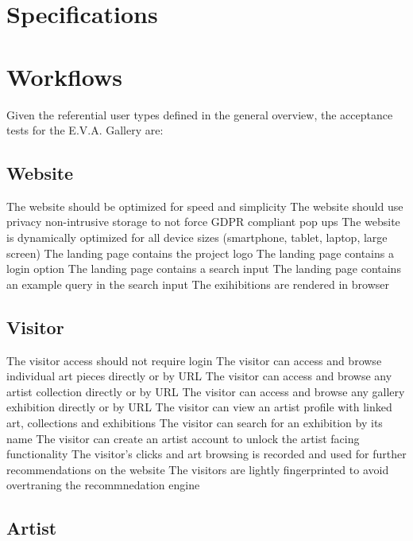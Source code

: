 \newpage

\chapter{Specifications}

\newpage

\chapter{Workflows}
Given the referential user types defined in the general overview, the acceptance tests for the E.V.A. Gallery are:
\section{Website}

    The website should be optimized for speed and simplicity
    The website should use privacy non-intrusive storage to not force GDPR compliant pop ups
    The website is dynamically optimized for all device sizes (smartphone, tablet, laptop, large screen)
    The landing page contains the project logo
    The landing page contains a login option
    The landing page contains a search input
    The landing page contains an example query in the search input
    The exihibitions are rendered in browser

\section{Visitor}

    The visitor access should not require login
    The visitor can access and browse individual art pieces directly or by URL
    The visitor can access and browse any artist collection directly or by URL
    The visitor can access and browse any gallery exhibition directly or by URL
    The visitor can view an artist profile with linked art, collections and exhibitions
    The visitor can search for an exhibition by its name
    The visitor can create an artist account to unlock the artist facing functionality
    The visitor's clicks and art browsing is recorded and used for further recommendations on the website
    The visitors are lightly fingerprinted to avoid overtraning the recommnedation engine

\section{Artist}

